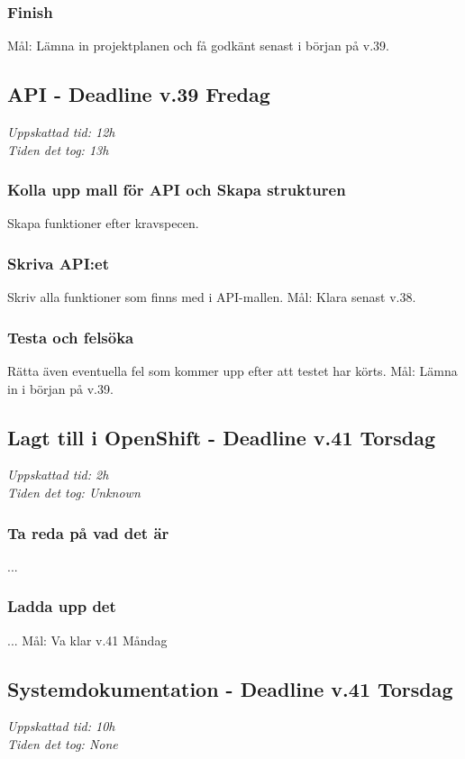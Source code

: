 \documentclass{TDP003mall}
\begin{document}
\subsubsection{Finish}
Mål: Lämna in projektplanen och få godkänt senast i början på v.39.

\subsection{API - Deadline v.39 Fredag}
\textit{Uppskattad tid: 12h \\ Tiden det tog: 13h}

\subsubsection{Kolla upp mall för API och Skapa strukturen}
Skapa funktioner efter kravspecen. 

\subsubsection{Skriva API:et}
Skriv alla funktioner som finns med i API-mallen.
Mål: Klara senast v.38.

\subsubsection{Testa och felsöka}
Rätta även eventuella fel som kommer upp efter att testet har körts.
Mål: Lämna in i början på v.39.

\subsection{Lagt till i OpenShift - Deadline v.41 Torsdag}
\textit{Uppskattad tid: 2h \\ Tiden det tog: Unknown}

\subsubsection{Ta reda på vad det är}
...

\subsubsection{Ladda upp det}
...
Mål: Va klar v.41 Måndag

\subsection{Systemdokumentation - Deadline v.41 Torsdag}
\textit{Uppskattad tid: 10h \\ Tiden det tog: None}
\end{document}
